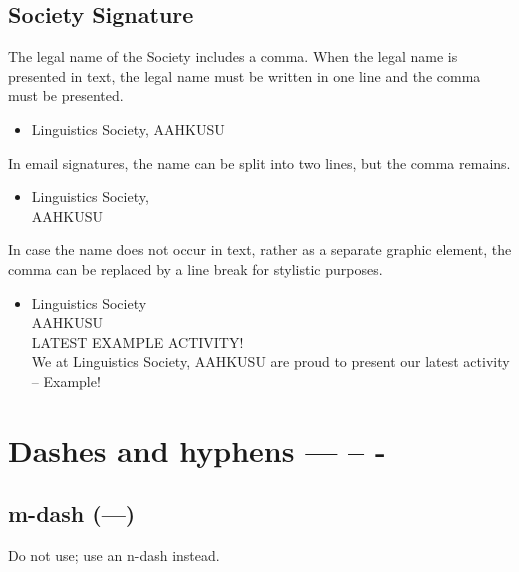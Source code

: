 \documentclass[11pt,a4paper]{book}
\newcommand{\cmark}{{\color{green(html/cssgreen)}\checkmark}}%
\begin{document}
	\subsection{Society Signature}
	The legal name of the Society includes a comma. When the legal name is presented in text, the legal name must be written in one line and the comma must be presented.
		{\firasans \begin{mdframed}[backgroundcolor=aliceblue] \begin{itemize}[label=\cmark]
			\item Linguistics Society, AAHKUSU
		\end{itemize} \end{mdframed} }
	In email signatures, the name can be split into two lines, but the comma remains.
	{\firasans \begin{mdframed}[backgroundcolor=aliceblue] \begin{itemize}[label=\cmark]
		\item Linguistics Society,\\
		AAHKUSU
	\end{itemize} \end{mdframed} }
	\newpage
	In case the name does not occur in text, rather as a separate graphic element, the comma can be replaced by a line break for stylistic purposes.
	{\firasans \begin{mdframed}[backgroundcolor=aliceblue] \begin{itemize}[label=\cmark]
		\item Linguistics Society\\
		AAHKUSU\\
		LATEST EXAMPLE ACTIVITY!\\		
		We at Linguistics Society, AAHKUSU are proud to present our latest activity -- Example!
	\end{itemize} \end{mdframed} }
	\section{Dashes and hyphens --- -- -}
		\subsection{m-dash (---)}
		Do not use; use an n-dash instead.
\end{document}
